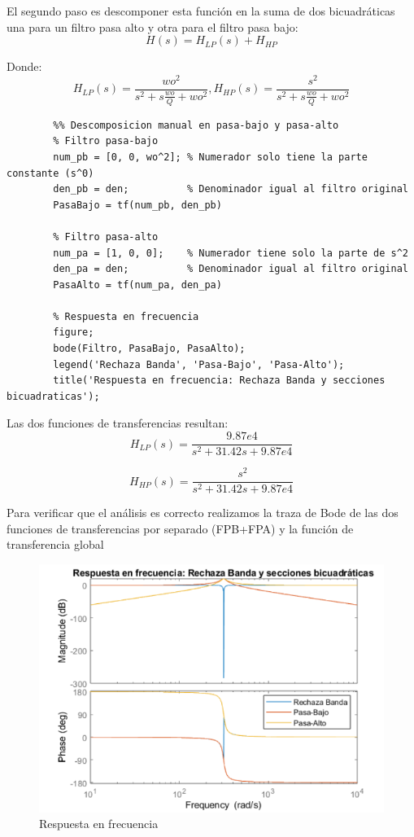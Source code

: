 \documentclass[12pt]{article}
\begin{document}
	El segundo paso es descomponer esta función en la suma de dos bicuadráticas una para un filtro pasa alto y otra para el filtro pasa bajo:
	\begin{equation}
		H(s)=H_{LP}(s)+H_{HP}
	\end{equation}
	
	Donde:
	\begin{equation}
		H_{LP}(s)=\frac{wo^2}{s^2+s\frac{wo}{Q}+wo^2} , H_{HP}(s)=\frac{s^2}{s^2+s\frac{wo}{Q}+wo^2}
	\end{equation}
	
	\begin{lstlisting}
		%% Descomposicion manual en pasa-bajo y pasa-alto
		% Filtro pasa-bajo
		num_pb = [0, 0, wo^2]; % Numerador solo tiene la parte constante (s^0)
		den_pb = den;          % Denominador igual al filtro original
		PasaBajo = tf(num_pb, den_pb)
		
		% Filtro pasa-alto
		num_pa = [1, 0, 0];    % Numerador tiene solo la parte de s^2
		den_pa = den;          % Denominador igual al filtro original
		PasaAlto = tf(num_pa, den_pa)
		
		% Respuesta en frecuencia
		figure;
		bode(Filtro, PasaBajo, PasaAlto);
		legend('Rechaza Banda', 'Pasa-Bajo', 'Pasa-Alto');
		title('Respuesta en frecuencia: Rechaza Banda y secciones bicuadraticas');
	\end{lstlisting}
	
	Las dos funciones de transferencias resultan:
	\begin{equation}
		H_{LP}(s)=\frac{9.87e4}{s^2+31.42s+9.87e4}
	\end{equation}
	
	\begin{equation}
		H_{HP}(s)=\frac{s^2}{s^2+31.42s+9.87e4}
	\end{equation}
	
	Para verificar que el análisis es correcto realizamos la traza de Bode de las dos funciones de transferencias por separado (FPB+FPA) y la función de transferencia global
	\begin{figure}[h!]
		\includegraphics[width=1\linewidth]{Imagenes/Bode}
		\caption[Respuesta en frecuencia]{Respuesta en frecuencia}
		\label{fig:bode}
	\end{figure}
	
\end{document}
